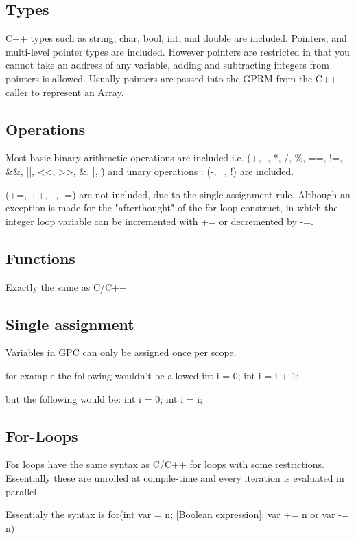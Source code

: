 \subsection{Types}
        C++ types such as string, char, bool, int, and double are included.
        Pointers, and multi-level pointer types are included.
        However pointers are restricted in that you cannot take
        an address of any variable, adding and subtracting integers
        from pointers is allowed. Usually pointers are passed into
        the GPRM from the C++ caller to represent an Array.
        
\subsection{Operations}
        Most basic binary arithmetic operations are included i.e. 
        (+, -, *, /, \%, ==, !=, \&\&, ||, <<, >>, \&, |, \^) and
        unary operations :
        (-, ~, !) 
        are included. 

        (+=, ++, --, -=) are not included, due to the single assignment rule.
        Although an exception is made for the "afterthought" of the for loop construct, in which
        the integer loop variable can be incremented with += or decremented by -=.

\subsection{Functions}
        Exactly the same as C/C++ 


\subsection{Single assignment}
       Variables in GPC can only be assigned once per scope.

       for example the following wouldn't be allowed
           int i = 0;
           int i = i + 1;

       but the following would be:
           int i = 0;
           {
               int i = i;
           }

\subsection{For-Loops}
       For loops have the same syntax as C/C++ for loops with some restrictions.
       Essentially these are unrolled at compile-time and every iteration is evaluated in parallel.
       
       Essentialy the syntax is for(int var = n; [Boolean expression]; var += n or var -= n) 

